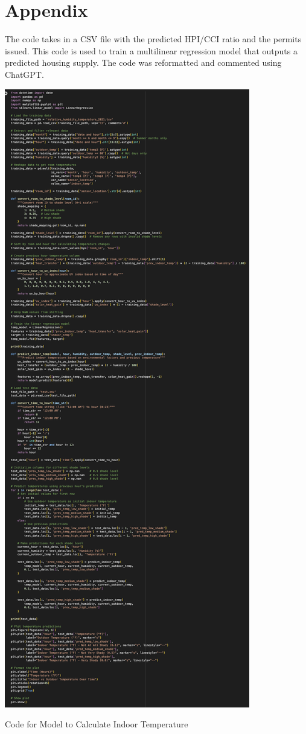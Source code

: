 \documentclass[12pt]{article}
\begin{document}
\newpage
\section{Appendix}
\par
The code takes in a CSV file with the predicted HPI/CCI ratio and the permits issued. This code is used to train a multilinear regression model that outputs a predicted housing supply. The code was reformatted and commented using ChatGPT.

\begin{center}
\includegraphics[scale=0.7]{q1-model.png}
\par Code for Model to Calculate Indoor Temperature
\end{center}
\end{document}
